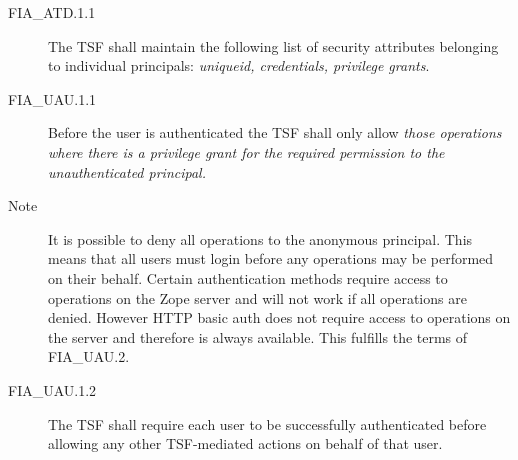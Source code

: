 \documentclass[12pt,english]{scrbook}
\begin{document}



\begin{description}

\item[FIA{\_}ATD.1.1 ]

The TSF shall maintain the following list of security attributes
belonging to individual principals: \emph{uniqueid, credentials, privilege
grants}.

\end{description}





\begin{description}

\item[FIA{\_}UAU.1.1 ]

Before the user is authenticated the TSF shall only allow \emph{those
operations where there is a privilege grant for the required permission to the
unauthenticated principal.}

\item[Note] It is possible to deny all operations to the anonymous
principal. This means that all users must login before any operations may
be performed on their behalf. Certain authentication methods require access to
operations on the Zope server and will not work if all operations are denied.
However HTTP basic auth does not require access to operations on the server
and therefore is always available.  This fulfills the terms of FIA{\_}UAU.2.


\item[FIA{\_}UAU.1.2 ]


The TSF shall require each user to be successfully
authenticated before allowing any other TSF-mediated actions on behalf
of that user.

\end{description}


\end{document}
